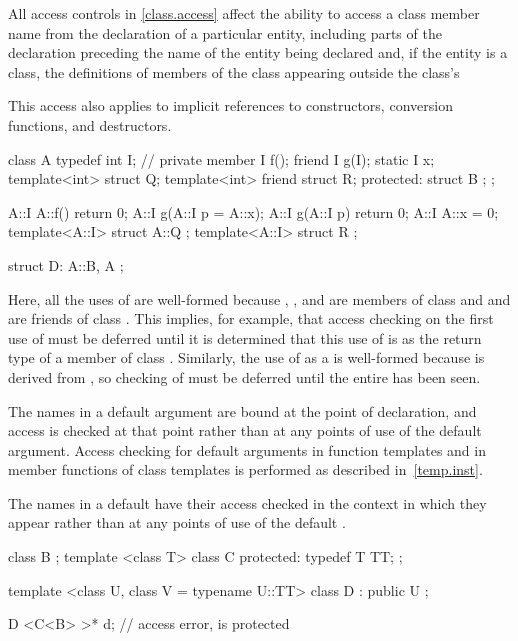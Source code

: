 \pnum
All access controls in \ref{class.access} affect the ability to access a class member
name from the declaration of a particular
entity, including parts of the declaration preceding the name of the entity
being declared and, if the entity is a class, the definitions of members of
the class appearing outside the class's 
\begin{note}
This access also applies to implicit references to constructors,
conversion functions, and destructors.
\end{note}

\pnum
\begin{example}
\begin{codeblock}
class A {
  typedef int I;    // private member
  I f();
  friend I g(I);
  static I x;
  template<int> struct Q;
  template<int> friend struct R;
protected:
    struct B { };
};

A::I A::f() { return 0; }
A::I g(A::I p = A::x);
A::I g(A::I p) { return 0; }
A::I A::x = 0;
template<A::I> struct A::Q { };
template<A::I> struct R { };

struct D: A::B, A { };
\end{codeblock}

Here, all the uses of
are well-formed because
,
, and 
are members of class
and
and  are friends of class
.
This implies, for example, that access checking on the first use of
must be deferred until it is determined that this use of
is as the return type of a member of class
.
Similarly, the use of  as a
 is well-formed because 
is derived from , so checking of 
must be deferred until the entire  has been seen.
\end{example}

\pnum
{}%
%
The names in a default argument are
bound at the point of declaration, and access is checked at that
point rather than at any points of use of the default argument.
Access checking for default arguments in function templates and in
member functions of class templates is performed as described in~\ref{temp.inst}.

\pnum
The names in a default 
have their access checked in the context in which they appear rather than at any
points of use of the default .
\begin{example}
\begin{codeblock}
class B { };
template <class T> class C {
protected:
  typedef T TT;
};

template <class U, class V = typename U::TT>
class D : public U { };

D <C<B> >* d;       // access error,  is protected
\end{codeblock}
\end{example}

